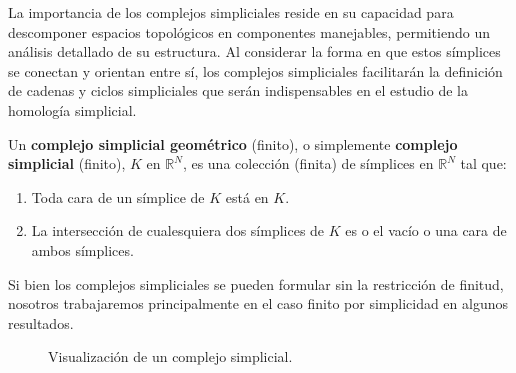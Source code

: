La importancia de los complejos simpliciales reside en su capacidad para descomponer
espacios topológicos en componentes manejables, permitiendo un análisis
detallado de su estructura. Al considerar la forma en que estos símplices se conectan
y orientan entre sí, los complejos simpliciales facilitarán la definición de
cadenas y ciclos simpliciales que serán indispensables en el estudio de la
homología simplicial.

\begin{definicion}
	Un \textbf{complejo simplicial geométrico} (finito), o simplemente \textbf{complejo
		simplicial} (finito), $K$ en $\mathbb{R}^{N}$, es una colección (finita) de
	símplices en $\mathbb{R}^{N}$ tal que:
	\begin{enumerate}
		\item Toda cara de un símplice de $K$ está en $K$.
		
		\item La intersección de cualesquiera dos símplices de $K$ es o el vacío o una
		cara de ambos símplices.
	\end{enumerate}
\end{definicion}
\begin{nota}
	Si bien los complejos simpliciales se pueden formular sin la restricción de finitud,
	nosotros trabajaremos principalmente en el caso finito por simplicidad en
	algunos resultados.
\end{nota}

\begin{figure}
	\centering
	\caption{Visualización de un complejo simplicial.}
\end{figure}

